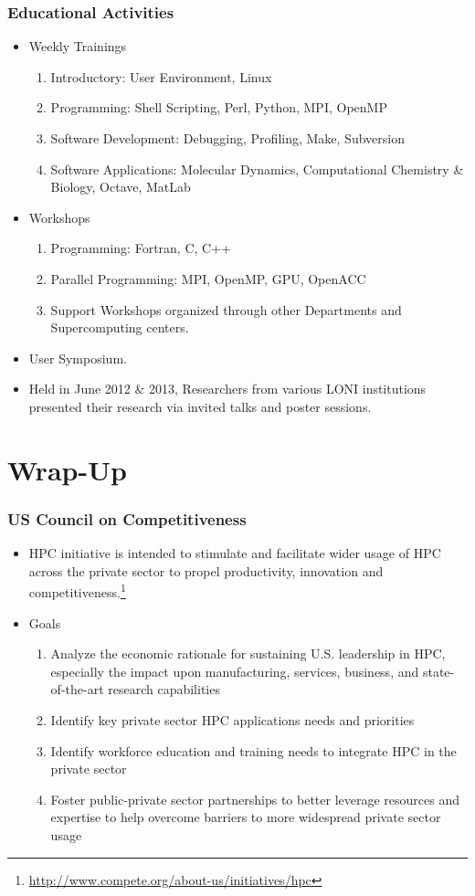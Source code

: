 \documentclass[slidestop,mathserif,compress,xcolor=svgnames,table]{beamer}
\newcommand*\vardiamond{\textcolor{tigerspurple}{%
  \ensuremath{\blacklozenge}}}
\begin{document}
\begin{frame}
  \frametitle{\small Educational Activities}
  \begin{itemize}
    \item Weekly Trainings
    \begin{enumerate}
      \item Introductory: User Environment, Linux
      \item Programming: Shell Scripting, Perl, Python, MPI, OpenMP
      \item Software Development: Debugging, Profiling, Make, Subversion
      \item Software Applications: Molecular Dynamics, Computational Chemistry \& Biology, Octave, MatLab
    \end{enumerate}
    \item Workshops
    \begin{enumerate}
      \item Programming: Fortran, C, C++
      \item Parallel Programming: MPI, OpenMP, GPU, OpenACC
      \item Support Workshops organized through other Departments and Supercomputing centers.
    \end{enumerate}
    \item User Symposium.
    \item[$\vardiamond$] Held in June 2012 \& 2013, Researchers from various LONI institutions presented their research via invited talks and poster sessions. 
  \end{itemize}
\end{frame}

\section{Wrap-Up}
\begin{frame}
  \frametitle{\small US Council on Competitiveness}
  \begin{itemize}
    \item HPC initiative  is intended to stimulate and facilitate wider usage of HPC across the private sector to propel productivity, innovation and competitiveness.\let\thefootnote\relax\footnote{\tiny \url{http://www.compete.org/about-us/initiatives/hpc}}
    \item Goals
    \begin{enumerate}
      \item Analyze the economic rationale for sustaining U.S. leadership in HPC, especially the impact upon manufacturing, services, business, and state-of-the-art research capabilities
      \item Identify key private sector HPC applications needs and priorities
      \item Identify workforce education and training needs to integrate HPC in the private sector
      \item Foster public-private sector partnerships to better leverage resources and expertise to help overcome barriers to more widespread private sector usage
    \end{enumerate}
  \end{itemize}
\end{frame}
\end{document}

